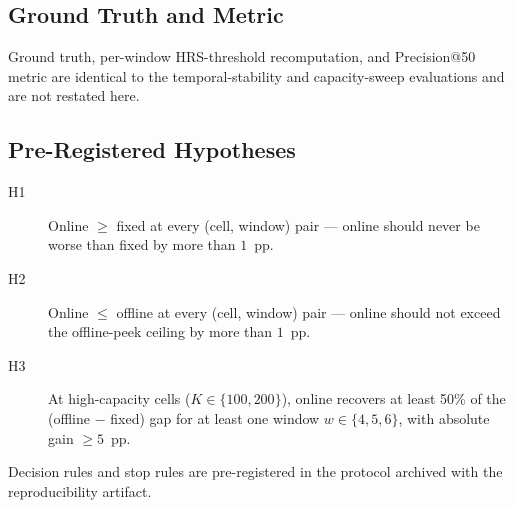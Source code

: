 \subsection{Ground Truth and Metric}

Ground truth, per-window HRS-threshold recomputation, and Precision@50
metric are identical to the temporal-stability and capacity-sweep evaluations and are not restated here.

\subsection{Pre-Registered Hypotheses}

\begin{description}
\item[H1] Online $\geq$ fixed at every (cell, window) pair --- online
should never be worse than fixed by more than $1$~pp.
\item[H2] Online $\leq$ offline at every (cell, window) pair --- online
should not exceed the offline-peek ceiling by more than $1$~pp.
\item[H3] At high-capacity cells ($K \in \{100, 200\}$), online
recovers at least 50\% of the (offline $-$ fixed) gap for at least one
window $w \in \{4, 5, 6\}$, with absolute gain $\geq 5$~pp.
\end{description}

Decision rules and stop rules are pre-registered in the protocol archived with the reproducibility artifact.
